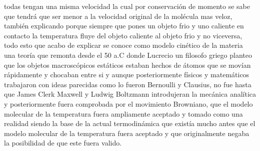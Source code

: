 \documentclass{article}
\begin{document}
todas tengan una misma velocidad la cual por conservación de momento se sabe que tendrá que ser menor a la velocidad original de 
la molécula mas veloz, también explicando porque siempre que pones un objeto frio y uno caliente en contacto la temperatura fluye del objeto 
caliente al objeto frio y no viceversa, todo esto que acabo de explicar se conoce como modelo cinético de la materia una teoría que remonta
desde el 50 a.C donde Lucrecio un filosofo griego planteo que los objetos macroscópicos estáticos estaban hechos de átomos que se movían rápidamente
y chocaban entre si y aunque posteriormente físicos y matemáticos trabajaron con ideas parecidas como lo fueron Bernoulli y Clausius, no fue hasta que
James Clerk Maxwell y Ludwig Boltzmann introdujeran la mecánica analítica y posteriormente fuera comprobada por el movimiento Browniano, 
que el modelo molecular de la temperatura fuera ampliamente aceptado y tomado como una realidad siendo la base de la actual termodinámica que 
existía mucho antes que el modelo molecular de la temperatura fuera aceptado y que originalmente negaba la posibilidad de que este fuera valido.
\end{document}

